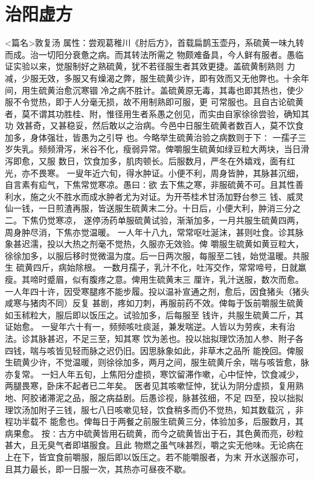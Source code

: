 \documentclass[a4paper,12pt,UTF8,twoside]{ctexbook}
\begin{document}
\chapter{治阳虚方}
<篇名>敦复汤
属性：尝观葛稚川《肘后方》，首载扁鹊玉壶丹，系硫黄一味九转而成。治一切阳分衰惫之病。而其转法所需之 
物颇难备具，今人鲜有服者。愚临证实验以来，觉服制好之熟硫黄，犹不若径服生者其效更捷。盖硫黄制熟则 
力减，少服无效，多服又有燥渴之弊，服生硫黄少许，即有效而又无他弊也。十余年间，用生硫黄治愈沉寒锢 
冷之病不胜计。盖硫黄原无毒，其毒也即其热也，使少服不令觉热，即于人分毫无损，故不用制熟即可服，更 
可常服也。且自古论硫黄者，莫不谓其功胜桂、附，惟径用生者系愚之创见，而实由自家徐徐尝验，确知其功 
效甚奇，又甚稳妥，然后敢以之治病。今邑中日服生硫黄者数百人，莫不饮食加多，身体强壮，皆愚为之引导 
也。今略举生硫黄治验之病数则于下∶ 
一孺子三岁失乳。频频滑泻，米谷不化，瘦弱异常。俾嚼服生硫黄如绿豆粒大两块，当日滑泻即愈，又服 
数日，饮食加多，肌肉顿长。后服数月，严冬在外嬉戏，面有红光，亦不畏寒。 
一叟年近六旬，得水肿证。小便不利，周身皆肿，其脉甚沉细，自言素有疝气，下焦常觉寒凉。愚曰∶欲 
去下焦之寒，非服硫黄不可。且其性善利水，施之火不胜水而成水肿者尤为对证。为开苓桂术甘汤加野台参三 
钱、威灵仙一钱，一日煎渣再服，皆送服生硫黄末二分。十日后，小便大利，肿消三分之二。下焦仍觉寒凉， 
遂停汤药单服硫黄试验，渐渐加多，一月共服生硫黄四两，周身肿尽消，下焦亦觉温暖。 
一人年十八九，常常呕吐涎沫，甚则吐食。诊其脉象甚迟濡，投以大热之剂毫不觉热，久服亦无效验。俾 
嚼服生硫黄如黄豆粒大，徐徐加多，以服后移时觉微温为度。后一日两次服，每服至二钱，始觉温暖。共服生 
硫黄四斤，病始除根。 
一数月孺子，乳汁不化，吐泻交作，常常啼号，日就羸瘦。其啼时蹙眉，似有腹疼之意。俾用生硫黄末三 
厘许，乳汁送服，数次而愈。 
一人年四十许，因受寒腿疼不能步履。投以温补宣通之剂，愈后，因食猪头（猪头咸寒与猪肉不同）反复 
甚剧，疼如刀刺，再服前药不效。俾每于饭前嚼服生硫黄如玉秫粒大，服后即以饭压之。试验加多，后每服至 
钱许，共服生硫黄二斤，其证始愈。 
一叟年六十有一，频频咳吐痰涎，兼发喘逆。人皆以为劳疾，未有治法。诊其脉甚迟，不足三至，知其寒 
饮为恙也。投以拙拟理饮汤加人参、附子各四钱，喘与咳皆见轻而脉之迟仍旧。因思脉象如此，非草木之品所 
能挽回。俾服生硫黄少许，不觉温暖，则徐徐加多，两月之间，服生硫黄斤余，喘与咳皆愈，脉亦复常。 
一妇人年五旬，上焦阳分虚损，寒饮留滞作嗽，心中怔忡，饮食减少，两腿畏寒，卧床不起者已二年矣。 
医者见其咳嗽怔忡，犹认为阴分虚损，复用熟地、阿胶诸滞泥之品，服之病益剧。后愚诊视，脉甚弦细，不足 
四至，投以拙拟理饮汤加附子三钱，服七八日咳嗽见轻，饮食稍多而仍不觉热，知其数载沉 ，非程功半载不 
能愈也。俾每日于两餐之前服生硫黄三分，体验加多，后服数月，其病果愈。 
按∶古方中硫黄皆用石硫黄，而今之硫黄皆出于石，其色黄而亮，砂粒甚大，且无臭气者即堪服食。且此 
物燃之虽气味甚烈，嚼之实无他味。无论病在上在下，皆宜食前嚼服，服后即以饭压之。若不能嚼服者，为末 
开水送服亦可，且其力最长，即一日服一次，其热亦可昼夜不歇。 
\end{document}
